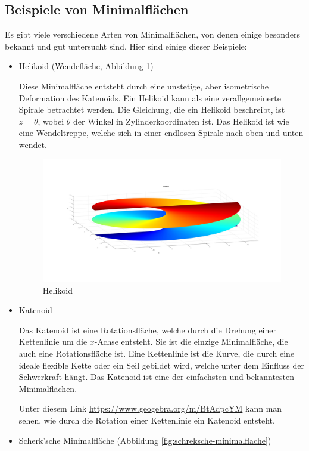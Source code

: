 \subsection{Beispiele von Minimalflächen
	\label{minimalflaechen:subsection:Beispiele von Minimalflächen}}
Es gibt viele verschiedene Arten von Minimalflächen, von denen einige besonders bekannt und gut untersucht sind.
Hier sind einige dieser Beispiele:
\begin{itemize}
	\item
	Helikoid (Wendefläche, Abbildung \ref{fig:helikoid})
	
	Diese Minimalfläche entsteht durch eine unstetige, aber isometrische Deformation des Katenoids.
	Ein Helikoid kann als eine verallgemeinerte Spirale betrachtet werden.
	Die Gleichung, die ein Helikoid beschreibt, ist $z=\theta$, wobei $\theta$ der Winkel in Zylinderkoordinaten ist.
	Das Helikoid ist wie eine Wendeltreppe, welche sich in einer endlosen Spirale nach oben und unten wendet.
\begin{figure}
	\centering
	\includegraphics[width=0.7\linewidth]{papers/minimalflaechen/Helikoid}
	\caption{Helikoid}
	\label{fig:helikoid}
\end{figure}

	\item
	Katenoid
	
	Das Katenoid ist eine Rotationsfläche, welche durch die Drehung einer Kettenlinie um die $x$-Achse entsteht.
	Sie ist die einzige Minimalfläche, die auch eine Rotationsfläche ist.
	Eine Kettenlinie ist die Kurve, die durch eine ideale flexible Kette oder ein Seil gebildet wird, welche unter dem Einfluss der Schwerkraft hängt.
	Das Katenoid ist eine der einfachsten und bekanntesten Minimalflächen.
	
	Unter diesem Link \url{https://www.geogebra.org/m/BtAdpcYM} kann man sehen, wie durch die Rotation einer Kettenlinie ein Katenoid entsteht.
	\item
	Scherk'sche Minimalfläche (Abbildung \ref{fig:schreksche-minimalflache})
	

\end{itemize}
